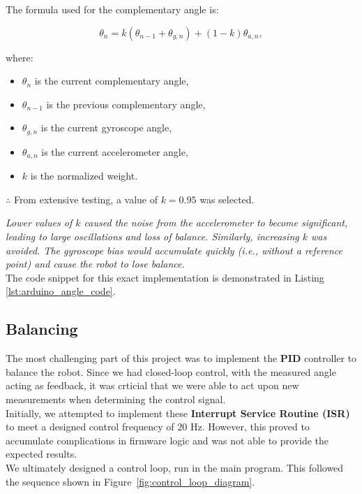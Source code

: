 \documentclass{article}
\begin{document}
The formula used for the complementary angle is:

\[
\theta_n = k(\theta_{n-1} + \theta_{g,n}) + (1-k)\theta_{a,n},
\]

where:
\begin{itemize}
    \item $\theta_n$ is the current complementary angle,
    \item $\theta_{n-1}$ is the previous complementary angle,
    \item $\theta_{g,n}$ is the current gyroscope angle,
    \item $\theta_{a,n}$ is the current accelerometer angle,
    \item $k$ is the normalized weight.
\end{itemize}

\begin{center}
    $\therefore$ From extensive testing, a value of $k = 0.95$ was selected. \\
\end{center}
\textit{Lower values of $k$
    caused the noise from the accelerometer to become significant, leading to large oscillations and loss of balance.
    Similarly, increasing $k$ was avoided. The gyroscope bias would accumulate quickly (i.e., without a reference point)
    and cause the robot to lose balance.
} \\

The code snippet for this exact implementation is demonstrated in Listing \ref{lst:arduino_angle_code}.

\subsection{Balancing}

\begin{minipage}{\linewidth}
    The most challenging part of this project was to implement the \textbf{PID} controller to balance the robot. Since we had closed-loop control,
    with the measured angle acting as feedback, it was crticial that we were able to act upon new measurements when determining the control signal. \\

    Initially, we attempted to implement these \textbf{Interrupt Service Routine (ISR)} to meet a designed control frequency of $20$ Hz.
    However, this proved to accumulate complications in firmware logic and was not able to provide the expected results. \\

    We ultimately designed a control loop, run in the main program. This followed the sequence shown in Figure~\ref{fig:control_loop_diagram}.
\end{minipage}
\end{document}

